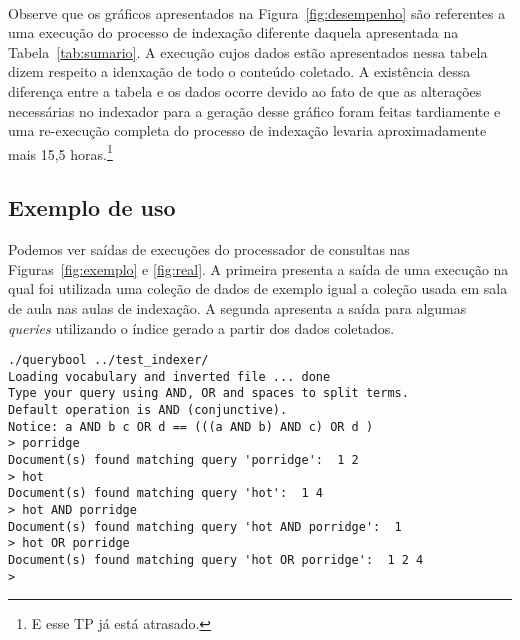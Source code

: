 \documentclass[10pt,twocolumn]{article}
\begin{document}
\begin{figure*}
  \centering
  \mbox{
 }
 \mbox{
  }
  \caption{Desempenho do indexador}
  \label{fig:desempenho}
\end{figure*}


Observe que os gráficos apresentados na Figura~\ref{fig:desempenho} são
referentes a uma execução do processo de indexação diferente daquela
apresentada na Tabela~\ref{tab:sumario}. A execução cujos dados estão
apresentados nessa tabela dizem respeito a idenxação de todo o conteúdo
coletado. A existência dessa diferença entre a tabela e os dados ocorre
devido ao fato de que as alterações necessárias no indexador para a
geração desse gráfico foram feitas tardiamente e uma re-execução
completa do processo de indexação levaria aproximadamente mais 15,5
horas.\footnote{E esse TP já está atrasado.}

\subsection{Exemplo de uso}

Podemos ver saídas de execuções do processador de consultas nas
Figuras~\ref{fig:exemplo} e \ref{fig:real}. A primeira presenta a saída
de uma execução na qual foi utilizada uma coleção de dados de exemplo
igual a coleção usada em sala de aula nas aulas de indexação. A segunda
apresenta a saída para algumas \emph{queries} utilizando o índice gerado
a partir dos dados coletados.

\begin{figure*}
\begin{center}
\begin{verbatim}
./querybool ../test_indexer/
Loading vocabulary and inverted file ... done
Type your query using AND, OR and spaces to split terms.
Default operation is AND (conjunctive).
Notice: a AND b c OR d == (((a AND b) AND c) OR d )
> porridge
Document(s) found matching query 'porridge':  1 2
> hot
Document(s) found matching query 'hot':  1 4
> hot AND porridge
Document(s) found matching query 'hot AND porridge':  1
> hot OR porridge
Document(s) found matching query 'hot OR porridge':  1 2 4
>
\end{verbatim}
\caption{Uso da ferramenta com uma base de exemplo}
\label{fig:exemplo}
\end{center}
\end{figure*}
\end{document}
